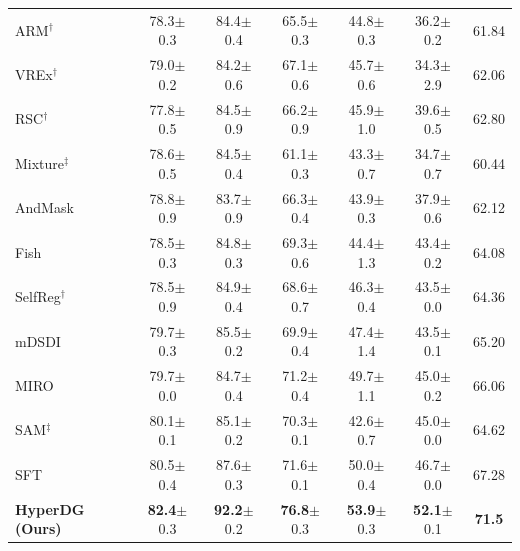 \documentclass[10pt]{article} %
\begin{document}
\begin{table}[t]
{\begin{tabular}{lcccccc}
ARM$^\dagger$~\cite{zhang2021adaptive} & 78.3$\pm$0.3 & 84.4$\pm$0.4 & 65.5$\pm$0.3 & 44.8$\pm$0.3 & 36.2$\pm$0.2 & 61.84 \\
VREx$^\dagger$~\cite{krueger2021out} & 79.0$\pm$0.2 & 84.2$\pm$0.6 & 67.1$\pm$0.6 & 45.7$\pm$0.6 & 34.3$\pm$2.9 & 62.06 \\
RSC$^\dagger$~\cite{huang2020self} & 77.8$\pm$0.5 & 84.5$\pm$0.9 & 66.2$\pm$0.9 & 45.9$\pm$1.0 & 39.6$\pm$0.5 & 62.80 \\
Mixture$^\ddagger$~\cite{zhou2021domain} & 78.6$\pm$0.5 & 84.5$\pm$0.4 & 61.1$\pm$0.3 & 43.3$\pm$0.7 & 34.7$\pm$0.7 & 60.44 \\
AndMask~\cite{parascandolo2020learning} & 78.8$\pm$0.9 & 83.7$\pm$0.9 & 66.3$\pm$0.4 & 43.9$\pm$0.3 & 37.9$\pm$0.6 & 62.12 \\
Fish~\cite{shi2021gradient} & 78.5$\pm$0.3 & 84.8$\pm$0.3 & 69.3$\pm$0.6 & 44.4$\pm$1.3 & 43.4$\pm$0.2 & 64.08 \\
SelfReg$^\dagger$~\cite{kim2021selfreg} & 78.5$\pm$0.9 & 84.9$\pm$0.4 & 68.6$\pm$0.7 & 46.3$\pm$0.4 & 43.5$\pm$0.0 & 64.36 \\
mDSDI~\cite{bui2021exploiting} & 79.7$\pm$0.3 & 85.5$\pm$0.2 & 69.9$\pm$0.4 & 47.4$\pm$1.4 & 43.5$\pm$0.1 & 65.20 \\
MIRO~\cite{cha2022domain} & 79.7$\pm$0.0 & 84.7$\pm$0.4 & 71.2$\pm$0.4 & 49.7$\pm$1.1 & 45.0$\pm$0.2 & 66.06 \\
SAM$^\ddagger$~\cite{foret2020sharpness} & 80.1$\pm$0.1 & 85.1$\pm$0.2 & 70.3$\pm$0.1 & 42.6$\pm$0.7 & 45.0$\pm$0.0 & 64.62 \\
SFT~\cite{li2025seeking} & 80.5$\pm$0.4 & 87.6$\pm$0.3 & 71.6$\pm$0.1 & 50.0$\pm$0.4 & 46.7$\pm$0.0 & 67.28 \\

\midrule
\textbf{HyperDG (Ours)} & \textbf{82.4}$\pm$0.3 & \textbf{92.2}$\pm$0.2 & \textbf{76.8}$\pm$0.3 & \textbf{53.9}$\pm$0.3 & \textbf{52.1}$\pm$0.1 & \textbf{71.5} \\
\bottomrule
\end{tabular}
}
\end{table}
\end{document}
